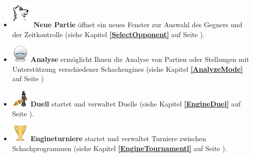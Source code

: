 \documentclass[11pt,a4paper]{article}
\begin{document}
	\begin{itemize}
		\item \includegraphics[scale=0.6]{BearChessIcon.png} \textbf{Neue Partie} öffnet ein neues Fenster zur Auswahl des Gegners und der Zeitkontrolle (siehe Kapitel \textbf{\ref{SelectOpponent}  } auf Seite \pageref{SelectOpponent}).
		
		\item \includegraphics[scale=0.5]{robot.png} \textbf{Analyse} ermöglicht Ihnen die Analyse von Partien oder Stellungen mit Unterstützung verschiedener Schachengines (siehe Kapitel \textbf{\ref{AnalyzeMode}  } auf Seite \pageref{AnalyzeMode})
		
		\item \includegraphics[scale=0.5]{6-2-chess-png.png} \textbf{Duell} startet und verwaltet Duelle (siehe Kapitel  \textbf{\ref{EngineDuel}  } auf Seite \pageref{EngineDuel} ).
		
		\item \includegraphics[scale=0.5]{cup_gold.png} \textbf{Engineturniere} startet und verwaltet Turniere zwischen Schachprogrammen (siehe Kapitel  \textbf{\ref{EngineTournamentl}  } auf Seite \pageref{EngineTournamentl} ).
		

\end{itemize}
\end{document}
